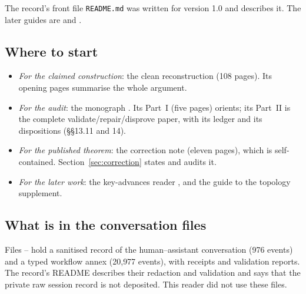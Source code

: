 The record's front file \texttt{README.md} was written for version 1.0 and describes it. The later guides are  and .

\subsection{Where to start}

\begin{itemize}
\item \emph{For the claimed construction}: the clean reconstruction  (108 pages). Its opening pages summarise the whole argument.
\item \emph{For the audit}: the monograph . Its Part~I (five pages) orients; its Part~II is the complete validate/repair/disprove paper, with its ledger and its dispositions (§§13.11 and 14).
\item \emph{For the published theorem}: the correction note  (eleven pages), which is self-contained. Section~\ref{sec:correction} states and audits it.
\item \emph{For the later work}: the key-advances reader , and the guide  to the topology supplement.
\end{itemize}

\subsection{What is in the conversation files}

Files -- hold a sanitised record of the human--assistant conversation (976 events) and a typed workflow annex (20{,}977 events), with receipts and validation reports. The record's README describes their redaction and validation and says that the private raw session record is not deposited. This reader did not use these files.
